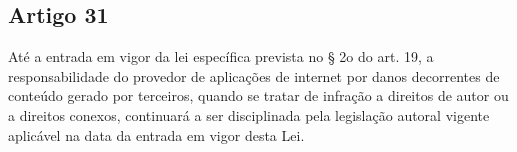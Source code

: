 \subsection{Artigo 31}
Até a entrada em vigor da lei específica prevista no § 2o do art. 19, a responsabilidade do provedor de aplicações de internet por danos decorrentes de conteúdo gerado por terceiros, quando se tratar de infração a direitos de autor ou a direitos conexos, continuará a ser disciplinada pela legislação autoral vigente aplicável na data da entrada em vigor desta Lei.